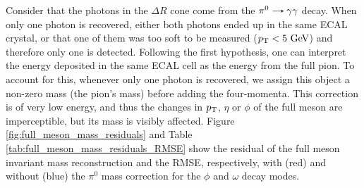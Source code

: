 Consider that the photons in the $\Delta R$ cone come from the $\pi^{0}\decaysto\gamma\gamma$ decay. When only one photon is recovered, either both photons ended up in the same ECAL crystal, or that one of them was too soft to be measured ($p_\text{T} < 5\ \text{GeV}$) and therefore only one is detected. Following the first hypothesis, one can interpret the energy deposited in the same ECAL cell as the energy from the full pion. To account for this, whenever only one photon is recovered, we assign this object a non-zero mass (the pion's mass) before adding the four-momenta. This correction is of very low energy, and thus the changes in $p_\text{T}$, $\eta$ or $\phi$ of the full meson are imperceptible, but its mass is visibly affected. Figure \ref{fig:full_meson_mass_residuals} and Table \ref{tab:full_meson_mass_residuals_RMSE} show the residual of the full meson invariant mass reconstruction and the RMSE, respectively, with (red) and without (blue) the $\pi^0$ mass correction for the $\phi$ and $\omega$ decay modes.
